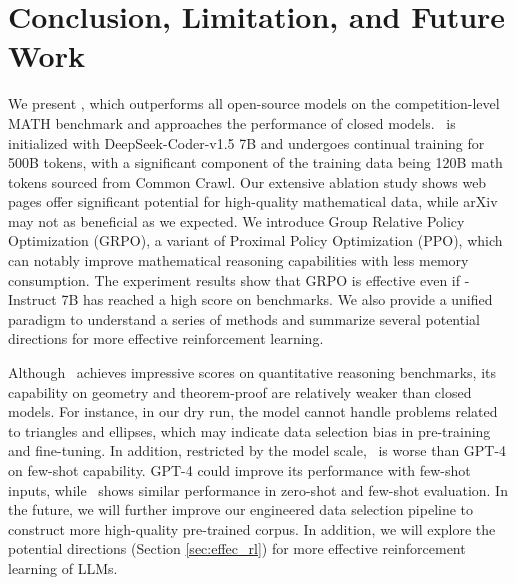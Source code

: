 \section{Conclusion, Limitation, and Future Work}
We present \spmath, which outperforms all open-source models on the competition-level MATH benchmark and approaches the performance of closed models.
\spmath~is initialized with DeepSeek-Coder-v1.5 7B and undergoes continual training for 500B tokens, with a significant component of the training data being 120B math tokens sourced from Common Crawl.
Our extensive ablation study shows web pages offer significant potential for high-quality mathematical data, while arXiv may not as beneficial as we expected.
We introduce Group Relative Policy Optimization (GRPO), a variant of Proximal Policy Optimization (PPO), which can notably improve mathematical reasoning capabilities with less memory consumption.
The experiment results show that GRPO is effective even if \spmath-Instruct 7B has reached a high score on benchmarks. 
We also provide a unified paradigm to understand a series of methods and summarize several potential directions for more effective reinforcement learning.

Although \spmath~achieves impressive scores on quantitative reasoning benchmarks, its capability on geometry and theorem-proof are relatively weaker than closed models.
For instance, in our dry run, the model cannot handle problems related to triangles and ellipses, which may indicate data selection bias in pre-training and fine-tuning. In addition, restricted by the model scale, \spmath~is worse than GPT-4 on few-shot capability.
GPT-4 could improve its performance with few-shot inputs, while \spmath~shows similar performance in zero-shot and few-shot evaluation.
In the future, we will further improve our engineered data selection pipeline to construct more high-quality pre-trained corpus.
In addition, we will explore the potential directions (Section \ref{sec:effec_rl}) for more effective reinforcement learning of LLMs.

\newpage


